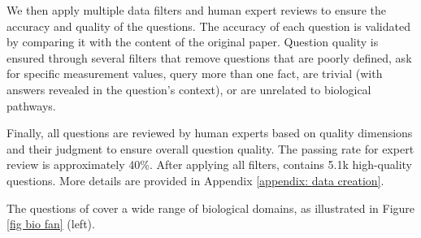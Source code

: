 We then apply multiple data filters and human expert reviews to ensure the accuracy and quality of the questions. The accuracy of each question is validated by comparing it with the content of the original paper. Question quality is ensured through several filters that remove questions that are poorly defined, ask for specific measurement values, query more than one fact, are trivial (with answers revealed in the question's context), or are unrelated to biological pathways.

Finally, all questions are reviewed by human experts based on quality dimensions and their judgment to ensure overall question quality. The passing rate for expert review is approximately 40\%. After applying all filters, \benchname contains 5.1k high-quality questions. More details are provided in Appendix \ref{appendix: data creation}.

The questions of \benchname cover a wide range of biological domains, as illustrated in Figure \ref{fig bio fan} (left).










